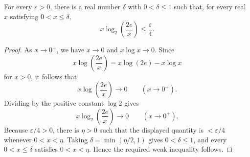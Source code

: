 \begin{helper}
For every \(\varepsilon>0\), there is a real number
\(\delta\) with \(0<\delta\le 1\) such that, for every real
\(x\) satisfying \(0<x\le\delta\),
\[
  x\log_2\left(\frac{2e}{x}\right)\le \frac{\varepsilon}{4}.
\]
\end{helper}
\begin{proof}
As \(x\to0^+\), we have \(x\to0\) and \(x\log x\to0\).  Since
\[
  x\log\left(\frac{2e}{x}\right)
  =x\log(2e)-x\log x
\]
for \(x>0\), it follows that
\[
  x\log\left(\frac{2e}{x}\right)\to0
  \qquad (x\to0^+).
\]
Dividing by the positive constant \(\log 2\) gives
\[
  x\log_2\left(\frac{2e}{x}\right)\to0
  \qquad (x\to0^+).
\]
Because \(\varepsilon/4>0\), there is \(\eta>0\) such that the displayed
quantity is \(<\varepsilon/4\) whenever \(0<x<\eta\).  Taking
\(\delta=\min(\eta/2,1)\) gives \(0<\delta\le1\), and every
\(0<x\le\delta\) satisfies \(0<x<\eta\).  Hence the required weak
inequality follows.
\end{proof}
